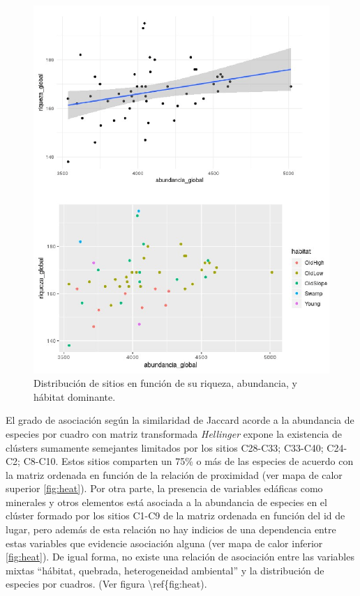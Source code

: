 \documentclass[11pt,]{article}
\begin{document}
\begin{figure}
\centering
\includegraphics[width=1.00000\textwidth]{Analisis/Diversidad/Graf_regre_lineal_aed_2.png}
\caption{Distribución de sitios en función de su riqueza, abundancia, y
hábitat dominante.\label{fig:leal}}
\end{figure}

El grado de asociación según la similaridad de Jaccard acorde a la
abundancia de especies por cuadro con matriz transformada
\emph{Hellinger} expone la existencia de clústers sumamente semejantes
limitados por los sitios C28-C33; C33-C40; C24-C2; C8-C10. Estos sitios
comparten un 75\% o más de las especies de acuerdo con la matriz
ordenada en función de la relación de proximidad (ver mapa de calor
superior \ref{fig:heat}). Por otra parte, la presencia de variables
edáficas como minerales y otros elementos está asociada a la abundancia
de especies en el clúster formado por los sitios C1-C9 de la matriz
ordenada en función del id de lugar, pero además de esta relación no hay
indicios de una dependencia entre estas variables que evidencie
asociación alguna (ver mapa de calor inferior \ref{fig:heat}). De igual
forma, no existe una relación de asociación entre las variables mixtas
``hábitat, quebrada, heterogeneidad ambiental'' y la distribución de
especies por cuadros. (Ver figura \textbackslash{}ref\{fig:heat).
\end{document}
